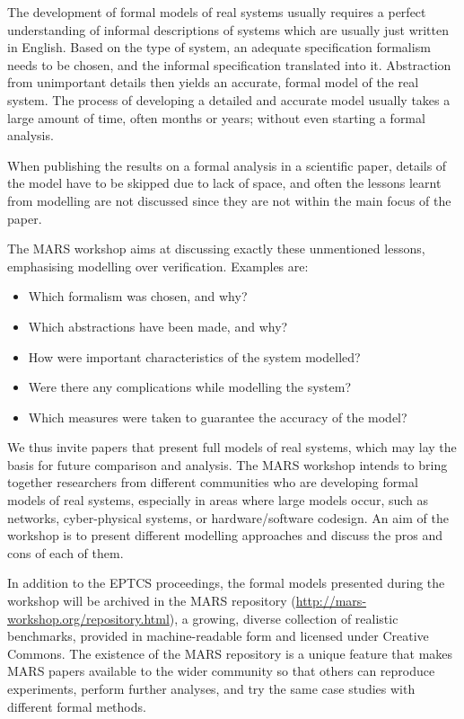 \documentclass{article}
\begin{document}
The development of formal models of real systems usually requires a
perfect understanding of informal descriptions of systems which are usually just
written in English. Based on the type of system, an adequate
specification formalism needs to be chosen, and the informal
specification translated into it. Abstraction from unimportant details
then yields an accurate, formal model of the real system.  The process
of developing a detailed and accurate model usually takes a large
amount of time, often months or years; without even starting a formal
analysis.

When publishing the results on a formal analysis in a
scientific paper, details of the model have to be skipped due to lack
of space, and often the lessons learnt from modelling are not
discussed since they are not within the main focus of the paper.

The MARS workshop aims at discussing exactly these unmentioned lessons,
emphasising modelling over verification.
Examples are:
\begin{itemize}
\setlength\itemsep{0pt}
\setlength\leftmargin{10pt}
   \item Which formalism was chosen, and why?
     \item Which abstractions have been made, and why?
      \item How were important characteristics of the system modelled?
    
    \item Were there any complications while modelling the system?
    \item Which measures were taken to guarantee the accuracy of the model?
\end{itemize}

We thus invite papers that present full models of real systems, which may
lay the basis for future comparison and analysis. The MARS workshop intends
to bring together researchers from different communities who are developing
formal models of real systems, especially in areas where large models occur,
such as networks, cyber-physical systems, or hardware/software codesign. An
aim of the workshop is to present different modelling approaches and discuss
the pros and cons of each of them.

In addition to the EPTCS proceedings, the formal models presented during
the workshop will be archived in the MARS repository
(\url{http://mars-workshop.org/repository.html}), a growing, diverse collection of
realistic benchmarks, provided in machine-readable form and licensed under
Creative Commons. The existence of the MARS repository is a unique feature
that makes MARS papers available to the wider community so that others can
reproduce experiments, perform further analyses, and try the same case studies
with different formal methods.
\end{document}
